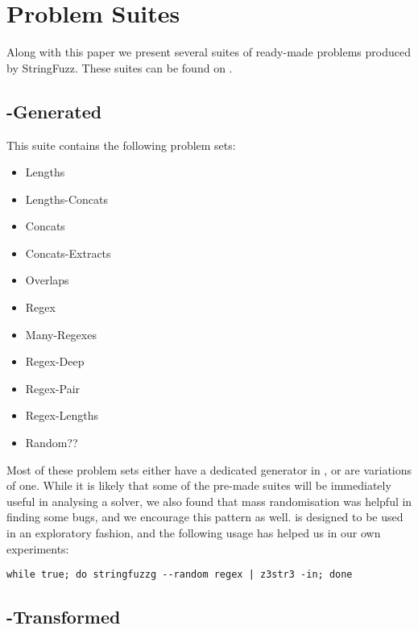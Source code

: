 \section{Problem Suites}

    Along with this paper we present several suites of ready-made problems produced by StringFuzz. These suites can be found on \problemRepo{}.

    \subsection{\fuzzer{}-Generated}

        This suite contains the following problem sets:

        \begin{itemize}
            \item Lengths
            \item Lengths-Concats
            \item Concats
            \item Concats-Extracts
            \item Overlaps
            \item Regex
            \item Many-Regexes
            \item Regex-Deep
            \item Regex-Pair
            \item Regex-Lengths
            \item Random??
        \end{itemize}

        Most of these problem sets either have a dedicated generator in \generator{}, or are variations of one. While it is likely that some of the pre-made suites will be immediately useful in analysing a solver, we also found that mass randomisation was helpful in finding some bugs, and we encourage this pattern as well. \generator{} is designed to be used in an exploratory fashion, and the following usage has helped us in our own experiments:

\begin{verbatim}
while true; do stringfuzzg --random regex | z3str3 -in; done
\end{verbatim}

    \subsection{\fuzzer{}-Transformed}

